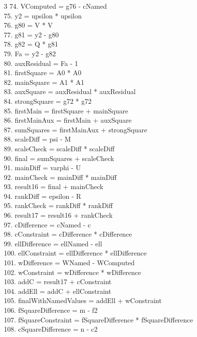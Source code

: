 \documentclass[10pt]{article}
\begin{document}
\begin{multicols}{3}
74. VComputed = g76 - cNamed\\
75. y2 = upsilon * upsilon\\
76. g80 = V * V\\
77. g81 = y2 - g80\\
78. g82 = Q * g81\\
79. Fa = y2 - g82\\
80. auxResidual = Fa - 1\\
81. firstSquare = A0 * A0\\
82. mainSquare = A1 * A1\\
83. auxSquare = auxResidual * auxResidual\\
84. strongSquare = g72 * g72\\
85. firstMain = firstSquare + mainSquare\\
86. firstMainAux = firstMain + auxSquare\\
87. sumSquares = firstMainAux + strongSquare\\
88. scaleDiff = psi - M\\
89. scaleCheck = scaleDiff * scaleDiff\\
90. final = sumSquares + scaleCheck\\
91. mainDiff = varphi - U\\
92. mainCheck = mainDiff * mainDiff\\
93. result16 = final + mainCheck\\
94. rankDiff = epsilon - R\\
95. rankCheck = rankDiff * rankDiff\\
96. result17 = result16 + rankCheck\\
97. cDifference = cNamed - c\\
98. cConstraint = cDifference * cDifference\\
99. ellDifference = ellNamed - ell\\
100. ellConstraint = ellDifference * ellDifference\\
101. wDifference = WNamed - WComputed\\
102. wConstraint = wDifference * wDifference\\
103. addC = result17 + cConstraint\\
104. addEll = addC + ellConstraint\\
105. finalWithNamedValues = addEll + wConstraint\\
106. fSquareDifference = m - f2\\
107. fSquareConstraint = fSquareDifference * fSquareDifference\\
108. cSquareDifference = n - c2\\

\end{multicols}
\end{document}
